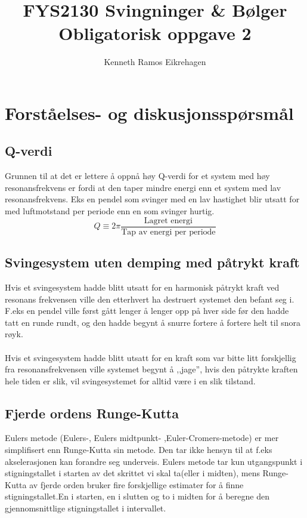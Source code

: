 \documentclass[a4paper,12pt,norsk]{article}
\title{FYS2130 Svingninger \& Bølger \\Obligatorisk oppgave 2}
\author{Kenneth Ramos Eikrehagen}
\begin{document}
\maketitle
\newpage
\tableofcontents
\listoffigures
\newpage


\section{Forståelses- og diskusjonsspørsmål}

\subsection{Q-verdi}
Grunnen til at det er lettere å oppnå høy Q-verdi for et system med høy resonansfrekvens er fordi at den taper mindre energi enn et system med lav resonansfrekvens. Eks en pendel som svinger med en lav hastighet blir utsatt for med luftmotstand per periode enn en som svinger hurtig. 
$$
Q \equiv 2\pi \frac{\text{Lagret energi}}{\text{Tap av energi per periode}}
$$

\subsection{Svingesystem uten demping med påtrykt kraft}
Hvis et svingesystem hadde blitt utsatt for en harmonisk påtrykt kraft ved resonans frekvensen ville den etterhvert ha destruert systemet den befant seg i. F.eks en pendel ville først gått lenger å lenger opp på hver side før den hadde tatt en runde rundt, og den hadde begynt å snurre fortere å fortere helt til snora røyk. 
\\ \\
Hvis et svingesystem hadde blitt utsatt for en kraft som var bitte litt forskjellig fra resonansfrekvensen ville systemet begynt å ,,jage'', hvis den påtrykte kraften hele tiden er slik, vil svingesystemet for alltid være i en slik tilstand.

\subsection{Fjerde ordens Runge-Kutta}
Eulers metode (Eulers-, Eulers midtpunkt- ,Euler-Cromers-metode) er mer simplifisert enn Runge-Kutta sin metode. Den tar ikke hensyn til at f.eks akselerasjonen kan forandre seg underveis.
Eulers metode tar kun utgangspunkt i stigningstallet i starten av det skrittet vi skal ta(eller i midten), mens Runge-Kutta av fjerde orden bruker fire forskjellige estimater for å finne stigningstallet.En i starten, en i slutten og to i midten for å beregne den gjennomsnittlige stigningstallet i intervallet. 
\end{document}
